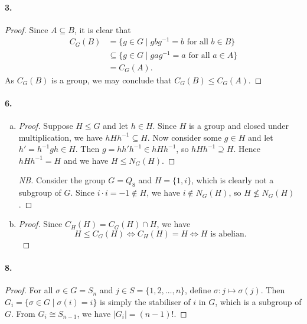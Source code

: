 \documentclass{article}
\begin{document}
\paragraph{3.}
\begin{proof}
  Since $A \subseteq B$, it is clear that \begin{align*}
    C_G(B)
    &= \{g \in G \mid gbg^{-1} = b \text{ for all } b \in B\} \\
    &\subseteq \{g \in G \mid gag^{-1} = a \text{ for all } a \in A\} \\
    &= C_G(A).
  \end{align*}
  As $C_G(B)$ is a group, we may conclude that $C_G(B) \leq C_G(A)$.
\end{proof}

\paragraph{6.}
\begin{enumerate}[(a)]
  \item \begin{proof}
      Suppose $H \leq G$ and let $h \in H$. Since $H$ is a group and closed
      under multiplication, we have $hHh^{-1} \subseteq H$. Now consider some
      $g \in H$ and let $h' = h^{-1}gh \in H$. Then $g = hh'h^{-1} \in
      hHh^{-1}$, so $hHh^{-1} \supseteq H$. Hence $hHh^{-1} = H$ and we have
      $H \leq N_G(H)$.
    \end{proof}
    \begin{proof}[NB]
      Consider the group $G = Q_8$ and $H = \{1, i\}$, which is clearly not a
      subgroup of $G$. Since $i \cdot i = -1 \not\in H$, we have $i \not\in
      N_G(H)$, so $H \nleq N_G(H)$.
    \end{proof}
  \item \begin{proof}
      Since $C_H(H) = C_G(H) \cap H$, we have \[
        H \leq C_G(H) \iff C_H(H) = H \iff H \text{ is abelian}.
      \]
    \end{proof}
\end{enumerate}

\paragraph{8.}
\begin{proof}
  For all $\sigma \in G = S_n$ and $j \in S = \{1, 2, \ldots, n\}$, define
  $\sigma: j \mapsto \sigma(j)$. Then $G_i = \{\sigma \in G \mid \sigma(i) =
  i\}$ is simply the stabiliser of $i$ in $G$, which is a subgroup of $G$. From
  $G_i \cong S_{n-1}$, we have $|G_i| = (n-1)!$.
\end{proof}
\end{document}
